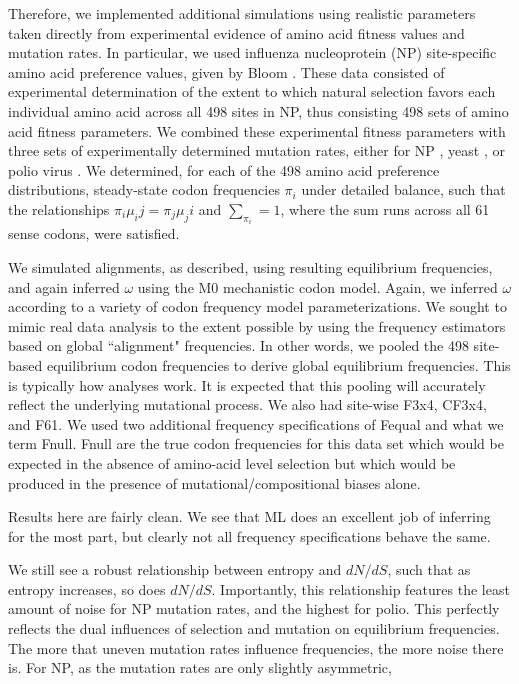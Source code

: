 \documentclass[11pt]{article}
\begin{document}
Therefore, we implemented additional simulations using realistic parameters taken directly from experimental evidence of amino acid fitness values and mutation rates. In particular, we used influenza nucleoprotein (NP) site-specific amino acid preference values, given by Bloom \cite{Bloom2014a}. These data consisted of experimental determination of the extent to which natural selection favors each individual amino acid across all 498 sites in NP, thus consisting 498 sets of amino acid fitness parameters. We combined these experimental fitness parameters with three sets of experimentally determined mutation rates, either for NP \cite{Bloom2014a}, yeast \cite{Zhu2014}, or polio virus \cite{Acevedo2014}. We determined, for each of the 498 amino acid preference distributions, steady-state codon frequencies $\pi_i$ under detailed balance, such that the relationships $\pi_i\mu_ij = \pi_j\mu_ji$ and $\sum_{\pi_i} = 1$, where the sum runs across all 61 sense codons, were satisfied.


We simulated alignments, as described, using resulting equilibrium frequencies, and again inferred $\omega$ using the M0 mechanistic codon model. Again, we inferred $\omega$ according to a variety of codon frequency model parameterizations. We sought to mimic real data analysis to the extent possible by using the frequency estimators based on global ``alignment" frequencies. In other words, we pooled the 498 site-based equilibrium codon frequencies to derive global equilibrium frequencies. This is typically how analyses work. It is expected that this pooling will accurately reflect the underlying mutational process. We also had site-wise F3x4, CF3x4, and F61. We used two additional frequency specifications of Fequal and what we term Fnull. Fnull are the true codon frequencies for this data set which would be expected in the absence of amino-acid level selection but which would be produced in the presence of mutational/compositional biases alone. 

Results here are fairly clean. We see that ML does an excellent job of inferring for the most part, but clearly not all frequency specifications behave the same. 


We still see a robust relationship between entropy and $dN/dS$, such that as entropy increases, so does $dN/dS$. Importantly, this relationship features the least amount of noise for NP mutation rates, and the highest for polio. This perfectly reflects the dual influences of selection and mutation on equilibrium frequencies. The more that uneven mutation rates influence frequencies, the more noise there is. For NP, as the mutation rates are only slightly asymmetric, 
\end{document}

